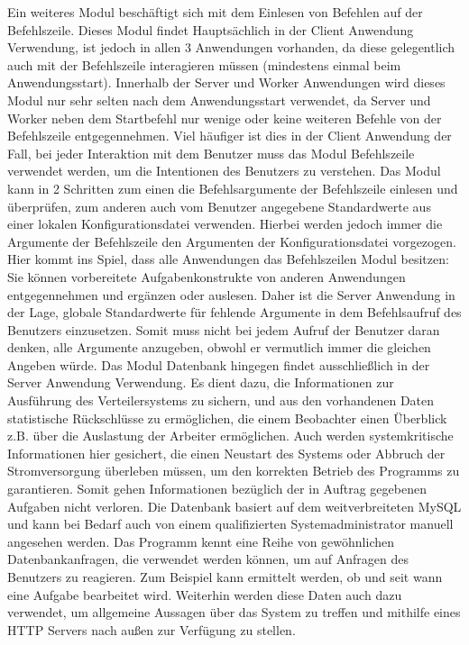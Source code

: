 \documentclass[a4paper,12pt]{article}
\begin{document}
Ein weiteres Modul beschäftigt sich mit dem Einlesen von Befehlen auf der Befehlszeile. Dieses Modul findet Hauptsächlich in der Client Anwendung Verwendung, ist jedoch in allen 3 Anwendungen vorhanden, da diese gelegentlich auch mit der Befehlszeile interagieren müssen (mindestens einmal beim Anwendungsstart).
\newline
Innerhalb der Server und Worker Anwendungen wird dieses Modul nur sehr selten nach dem Anwendungsstart verwendet, da Server und Worker neben dem Startbefehl nur wenige oder keine weiteren Befehle von der Befehlszeile entgegennehmen. Viel häufiger ist dies in der Client Anwendung der Fall, bei jeder Interaktion mit dem Benutzer muss das Modul Befehlszeile verwendet werden, um die Intentionen des Benutzers zu verstehen.
\newline
Das Modul kann in 2 Schritten zum einen die Befehlsargumente der Befehlszeile einlesen und überprüfen, zum anderen auch vom Benutzer angegebene Standardwerte aus einer lokalen Konfigurationsdatei verwenden. Hierbei werden jedoch immer die Argumente der Befehlszeile den Argumenten der Konfigurationsdatei vorgezogen. Hier kommt ins Spiel, dass alle Anwendungen das Befehlszeilen Modul besitzen: Sie können vorbereitete Aufgabenkonstrukte von anderen Anwendungen entgegennehmen und ergänzen oder auslesen. Daher ist die Server Anwendung in der Lage, globale Standardwerte für fehlende Argumente in dem Befehlsaufruf des Benutzers einzusetzen. Somit muss nicht bei jedem Aufruf der Benutzer daran denken, alle Argumente anzugeben, obwohl er vermutlich immer die gleichen Angeben würde.
\newline\newline
Das Modul Datenbank hingegen findet ausschließlich in der Server Anwendung Verwendung. Es dient dazu, die Informationen zur Ausführung des Verteilersystems zu sichern, und aus den vorhandenen Daten statistische Rückschlüsse zu ermöglichen, die einem Beobachter einen Überblick z.B. über die Auslastung der Arbeiter ermöglichen. Auch werden systemkritische Informationen hier gesichert, die einen Neustart des Systems oder Abbruch der Stromversorgung überleben müssen, um den korrekten Betrieb des Programms zu garantieren. Somit gehen Informationen bezüglich der in Auftrag gegebenen Aufgaben nicht verloren.
\newline
Die Datenbank basiert auf dem weitverbreiteten MySQL und kann bei Bedarf auch von einem qualifizierten Systemadministrator manuell angesehen werden. Das Programm kennt eine Reihe von gewöhnlichen Datenbankanfragen, die verwendet werden können, um auf Anfragen des Benutzers zu reagieren. Zum Beispiel kann ermittelt werden, ob und seit wann eine Aufgabe bearbeitet wird. Weiterhin werden diese Daten auch dazu verwendet, um allgemeine Aussagen über das System zu treffen und mithilfe eines HTTP Servers nach außen zur Verfügung zu stellen.
\end{document}

